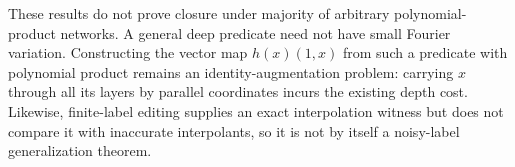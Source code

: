 These results do not prove closure under majority of arbitrary
polynomial-product networks. A general deep predicate need not
have small Fourier variation. Constructing the vector map
$h(x)(1,x)$ from such a predicate with polynomial product remains
an identity-augmentation problem: carrying $x$ through all its
layers by parallel coordinates incurs the existing depth cost.
Likewise, finite-label editing supplies an exact interpolation
witness but does not compare it with inaccurate interpolants, so
it is not by itself a noisy-label generalization theorem.
